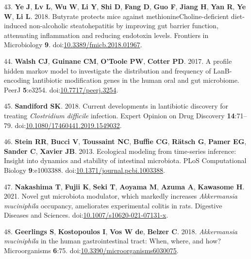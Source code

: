 \documentclass[
  12pt,
]{article}
\newenvironment{cslreferences}%
  {}%
  {\par}
\begin{document}
\begin{cslreferences}
\leavevmode\hypertarget{ref-Ye2018}{}%
43. \textbf{Ye J}, \textbf{Lv L}, \textbf{Wu W}, \textbf{Li Y},
\textbf{Shi D}, \textbf{Fang D}, \textbf{Guo F}, \textbf{Jiang H},
\textbf{Yan R}, \textbf{Ye W}, \textbf{Li L}. 2018. Butyrate protects
mice against methionineCholine-deficient diet-induced non-alcoholic
steatohepatitis by improving gut barrier function, attenuating
inflammation and reducing endotoxin levels. Frontiers in Microbiology
\textbf{9}.
doi:\href{https://doi.org/10.3389/fmicb.2018.01967}{10.3389/fmicb.2018.01967}.

\leavevmode\hypertarget{ref-Walsh2017}{}%
44. \textbf{Walsh CJ}, \textbf{Guinane CM}, \textbf{O'Toole PW},
\textbf{Cotter PD}. 2017. A profile hidden markov model to investigate
the distribution and frequency of LanB-encoding lantibiotic modification
genes in the human oral and gut microbiome. PeerJ \textbf{5}:e3254.
doi:\href{https://doi.org/10.7717/peerj.3254}{10.7717/peerj.3254}.

\leavevmode\hypertarget{ref-Sandiford2018}{}%
45. \textbf{Sandiford SK}. 2018. Current developments in lantibiotic
discovery for treating \emph{Clostridium difficile} infection. Expert
Opinion on Drug Discovery \textbf{14}:71--79.
doi:\href{https://doi.org/10.1080/17460441.2019.1549032}{10.1080/17460441.2019.1549032}.

\leavevmode\hypertarget{ref-Stein2013}{}%
46. \textbf{Stein RR}, \textbf{Bucci V}, \textbf{Toussaint NC},
\textbf{Buffie CG}, \textbf{Rätsch G}, \textbf{Pamer EG}, \textbf{Sander
C}, \textbf{Xavier JB}. 2013. Ecological modeling from time-series
inference: Insight into dynamics and stability of intestinal microbiota.
PLoS Computational Biology \textbf{9}:e1003388.
doi:\href{https://doi.org/10.1371/journal.pcbi.1003388}{10.1371/journal.pcbi.1003388}.

\leavevmode\hypertarget{ref-Nakashima2021}{}%
47. \textbf{Nakashima T}, \textbf{Fujii K}, \textbf{Seki T},
\textbf{Aoyama M}, \textbf{Azuma A}, \textbf{Kawasome H}. 2021. Novel
gut microbiota modulator, which markedly increases \emph{Akkermansia
muciniphila} occupancy, ameliorates experimental colitis in rats.
Digestive Diseases and Sciences.
doi:\href{https://doi.org/10.1007/s10620-021-07131-x}{10.1007/s10620-021-07131-x}.

\leavevmode\hypertarget{ref-Geerlings2018}{}%
48. \textbf{Geerlings S}, \textbf{Kostopoulos I}, \textbf{Vos W de},
\textbf{Belzer C}. 2018. \emph{Akkermansia muciniphila} in the human
gastrointestinal tract: When, where, and how? Microorganisms
\textbf{6}:75.
doi:\href{https://doi.org/10.3390/microorganisms6030075}{10.3390/microorganisms6030075}.


\end{cslreferences}
\end{document}
